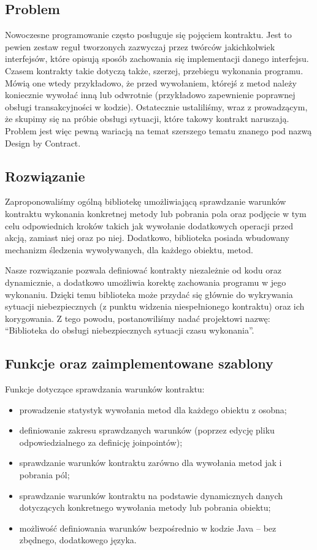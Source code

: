 \documentclass[12pt,a4paper,titlepage]{article}
\begin{document}
 \subsection{Problem}
  Nowoczesne programowanie często posługuje się pojęciem kontraktu. Jest to pewien zestaw reguł tworzonych zazwyczaj przez twórców jakichkolwiek interfejsów, które opisują sposób zachowania się implementacji danego interfejsu. Czasem kontrakty takie dotyczą także, szerzej, przebiegu wykonania programu. Mówią one wtedy przykładowo, że przed wywołaniem, którejś z metod należy koniecznie wywołać inną lub odwrotnie (przykładowo zapewnienie poprawnej obsługi transakcyjności w kodzie). Ostatecznie ustaliliśmy, wraz z prowadzącym, że skupimy się na próbie obsługi sytuacji, które takowy kontrakt naruszają. Problem jest więc pewną wariacją na temat szerszego tematu znanego pod nazwą Design by Contract.
   
 \subsection{Rozwiązanie}
  Zaproponowaliśmy ogólną bibliotekę umożliwiającą sprawdzanie warunków kontraktu wykonania konkretnej metody lub pobrania pola oraz podjęcie w tym celu odpowiednich kroków takich jak wywołanie dodatkowych operacji przed akcją, zamiast niej oraz po niej. Dodatkowo, biblioteka posiada wbudowany mechanizm śledzenia wywoływanych, dla każdego obiektu, metod.
   
  Nasze rozwiązanie pozwala definiować kontrakty niezależnie od kodu oraz dynamicznie, a dodatkowo umożliwia korektę zachowania programu w jego wykonaniu. Dzięki temu biblioteka może przydać się głównie do wykrywania sytuacji niebezpiecznych (z punktu widzenia niespełnionego kontraktu) oraz ich korygowania. Z tego powodu, postanowiliśmy nadać projektowi nazwę: ``Biblioteka do obsługi niebezpiecznych sytuacji czasu wykonania''.
  
  \subsection{Funkcje oraz zaimplementowane szablony}
   Funkcje dotyczące sprawdzania warunków kontraktu:
   \begin{itemize}
    \item prowadzenie statystyk wywołania metod dla każdego obiektu z osobna;
    \item definiowanie zakresu sprawdzanych warunków (poprzez edycję pliku odpowiedzialnego za definicję joinpointów);
    \item sprawdzanie warunków kontraktu zarówno dla wywołania metod jak i pobrania pól;
    \item sprawdzanie warunków kontraktu na podstawie dynamicznych danych dotyczących konkretnego wywołania metody lub pobrania obiektu;
    \item możliwość definiowania warunków bezpośrednio w kodzie Java -- bez zbędnego, dodatkowego języka.
   \end{itemize}
   
\end{document}

